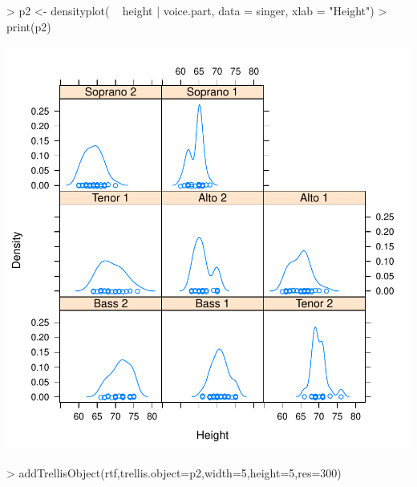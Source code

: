 \documentclass[11pt,letterpaper]{article}
\begin{document}
\begin{Schunk}
\begin{Sinput}
> p2 <- densityplot( ~ height | voice.part, data = singer, xlab = "Height")
> print(p2)
\end{Sinput}
\end{Schunk}
\includegraphics{rtf-025}

\begin{Schunk}
\begin{Sinput}
> addTrellisObject(rtf,trellis.object=p2,width=5,height=5,res=300)
\end{Sinput}
\end{Schunk}
\end{document}
